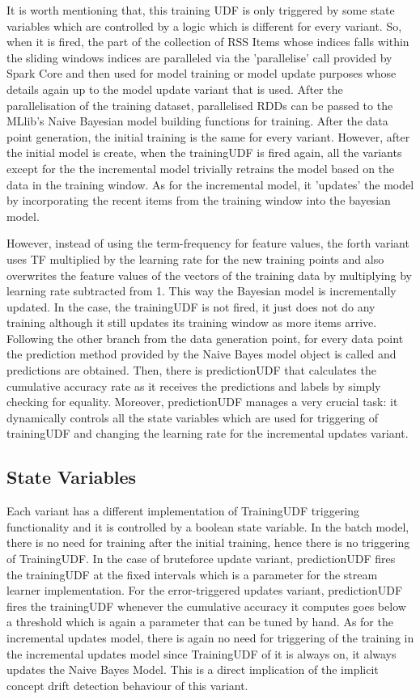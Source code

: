 \documentclass{article} %
\begin{document}
It is worth mentioning that, this training UDF is only triggered by some state variables which are controlled by a logic which is different for every variant. So, when it is fired, the part of the collection of RSS Items whose indices falls within the sliding windows indices are paralleled via the 'parallelise' call provided by Spark Core and then used for model training or model update purposes whose details again up to the model update variant that is used. After the parallelisation of the training dataset, parallelised RDDs can be passed to the MLlib's Naive Bayesian model building functions for training. After the data point generation, the initial training is the same for every variant. However, after the initial model is create, when the trainingUDF is fired again, all the variants except for the the incremental model trivially retrains the model based on the data in the training window. As for the incremental model, it 'updates' the model by incorporating the recent items  from the training window into the bayesian model. 

However, instead of using the term-frequency for feature values, the forth variant uses TF multiplied by the learning rate for the new training points and also overwrites the feature values of the vectors of the training data by multiplying by learning rate subtracted from 1. This way the Bayesian model is incrementally updated. In the case, the trainingUDF is not fired, it just does not do any training although it still updates its training window as more items arrive. Following the other branch from the data generation point, for every data point the prediction method provided by the Naive Bayes model object is called and predictions are obtained. Then, there is predictionUDF that calculates the cumulative accuracy rate as it receives the predictions and labels by simply checking for equality. Moreover, predictionUDF manages a very crucial task: it dynamically controls all the state variables which are used for triggering of trainingUDF and changing the learning rate for the incremental updates variant.

\subsection{State Variables}
Each variant has a different implementation of TrainingUDF triggering functionality and it is controlled by a boolean state variable. In the batch model, there is no need for training after the initial training, hence there is no triggering of TrainingUDF. 
In the case of bruteforce update variant, predictionUDF fires the trainingUDF at the fixed intervals which is a parameter for the stream learner implementation. For the error-triggered updates variant, predictionUDF fires the trainingUDF whenever the cumulative accuracy it computes goes below a threshold which is again a parameter that can be tuned by hand. As for the incremental updates model, there is again no need for triggering of the training in the incremental updates model since TrainingUDF of it is always on, it always updates the Naive Bayes Model. This is a direct implication of the implicit concept drift detection behaviour of this variant.
\end{document}
